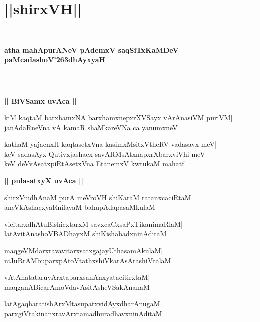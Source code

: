 \documentclass[twoside,12pt,openright]{book}
\def\S{\char'263}
\newcounter{shloka}[chapter]
\def\uvaca#1{\centerline{{\large\textbf{#1}}}}
\begin{document}
\chapter{||shirxVH||}
\begin{center}
\rule{2cm}{1pt}\\[0.5cm]
{\LARGE\bfseries atha mahApurANeV pAdemxV saqSiTxKaMDeV}\\[.3cm]
{\LARGE\bfseries paMcadashoV\S dhAyxyaH}\\[.3cm]
\rule{2cm}{1pt}\\
\end{center}

\uvaca{|| BiVSamx uvAca ||}
\begin{shloka}%
kiM kaqtaM barxhamxNA barxhamxnepxrXVSayx vArAnasiVM puriVM|\\
janAdaRneVna vA kamaR shaMkareVNa ca yanumxneV
\end{shloka}

\begin{shloka}%
kathaM yajacnxH kaqtasetxVna kasimxMsitxVtheRV vadasavx meV|\\
keV sadasAyx Qutivxjashacx savARMsAtxnapxrXbarxviVhi meV|\\
keV deVvAsatxpiRtAsetxVna EtanemxV kwtukaM mahatf
\end{shloka}

\uvaca{|| pulasatxyX uvAca ||}
\begin{shloka}%
shirxVnidhAnaM purA meVroVH shiKaraM ratanxcaciRtaM|\\
aneVkAshacxyaRnilayaM bahupAdapasaMkulaM
\end{shloka}

\begin{shloka}%
vicitarxdhAtuBishicxtarxM savxcaCxsaPxTikanimaRlaM|\\
latAvitAnashoVBADhayxM shiKishabadxninAditaM
\end{shloka}

\begin{shloka}%
maqgeVMdarxravavitarxsatxgajayUthasamAkulaM|\\
niJuRrAMbuparxpAtoVtathxshiVkarAsArashiVtalaM
\end{shloka}

\begin{shloka}%
vAtAhatataruvArxtaparxsanAnxyatacitirxtaM|\\
maqganABicarAmoVdavAsitAsheVSakAnanaM
\end{shloka}

\begin{shloka}%
latAgaqharatishArxMtasupatxvidAyxdharAnugaM|\\
parxgiVtakinanxravArxtamadhuradhavxninAditaM
\end{shloka}
\end{document}
